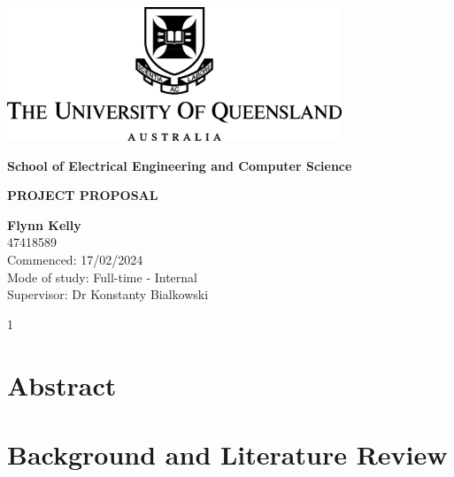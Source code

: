 \documentclass[12pt,a4paper]{article}
\begin{document}
\begin{titlepage}
    \begin{center}
        \vspace*{1cm}

        \includegraphics[width=0.75\textwidth]{UQLogo.jpg}
        
        \vspace{1.5cm}
        
        \textbf{\Large{School of Electrical Engineering and Computer Science}}
        
        \vspace{2.5cm}
        
        \textbf{\Large{PROJECT PROPOSAL}}
        
        \vspace{2cm}
        
        \textbf{Flynn Kelly}\\
        47418589\\
        
        Commenced: 17/02/2024\\
        Mode of study: Full-time - Internal\\
        Supervisor: Dr Konstanty Bialkowski
        
        \vfill
        
        \vspace{0.8cm}
        
        \Large{1}
        
    \end{center}
\end{titlepage}

\tableofcontents
\clearpage

\section{Abstract}

\section{Background and Literature Review}
\end{document}

